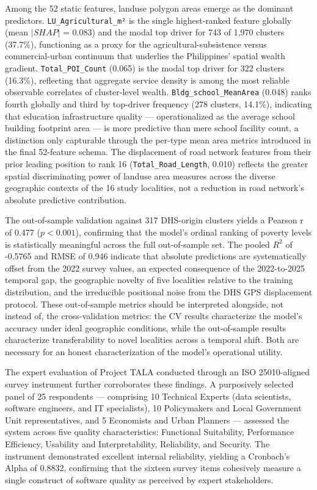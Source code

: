 \documentclass[12pt, letterpaper]{article}
\numberwithin{figure}{section}
\numberwithin{table}{section}
\begin{document}
Among the 52 static features, landuse polygon areas emerge as the
dominant predictors. \verb|LU_Agricultural_m²| is the single
highest-ranked feature globally (mean $|SHAP|$ = 0.083) and the modal
top driver for 743 of 1,970 clusters (37.7\%), functioning as a proxy
for the agricultural-subsistence versus commercial-urban continuum
that underlies the Philippines' spatial wealth gradient.
\verb|Total_POI_Count| (0.065) is the modal top driver for 322
clusters (16.3\%), reflecting that aggregate service density is among
the most reliable observable correlates of cluster-level wealth.
\verb|Bldg_school_MeanArea| (0.048) ranks fourth globally and third
by top-driver frequency (278 clusters, 14.1\%), indicating that
education infrastructure quality — operationalized as the average
school building footprint area — is more predictive than mere school
facility count, a distinction only capturable through the per-type
mean area metrics introduced in the final 52-feature schema. The
displacement of road network features from their prior leading
position to rank 16 (\verb|Total_Road_Length|, 0.010) reflects the
greater spatial discriminating power of landuse area measures across
the diverse geographic contexts of the 16 study localities, not a
reduction in road network's absolute predictive contribution.

The out-of-sample validation against 317 DHS-origin clusters yields a
Pearson r of 0.477 ($p < 0.001$), confirming that the model's ordinal
ranking of poverty levels is statistically meaningful across the full
out-of-sample set. The pooled $R^2$ of -0.5765 and RMSE of 0.946
indicate that absolute predictions are systematically offset from the
2022 survey values, an expected consequence of the 2022-to-2025
temporal gap, the geographic novelty of five localities relative to
the training distribution, and the irreducible positional noise from
the DHS GPS displacement protocol. These out-of-sample metrics should
be interpreted alongside, not instead of, the cross-validation
metrics: the CV results characterize the model's accuracy under ideal
geographic conditions, while the out-of-sample results characterize
transferability to novel localities across a temporal shift. Both are
necessary for an honest characterization of the model's operational utility.

The expert evaluation of Project TALA conducted through an ISO
25010-aligned survey instrument further corroborates these findings.
A purposively selected panel of 25 respondents — comprising 10
Technical Experts (data scientists, software engineers, and IT
specialists), 10 Policymakers and Local Government Unit
representatives, and 5 Economists and Urban Planners — assessed the
system across five quality characteristics: Functional Suitability,
Performance Efficiency, Usability and Interpretability, Reliability,
and Security. The instrument demonstrated excellent
internal reliability, yielding a Cronbach's Alpha of 0.8832,
confirming that the sixteen survey items cohesively measure a single
construct of software quality as perceived by expert stakeholders.
\end{document}
